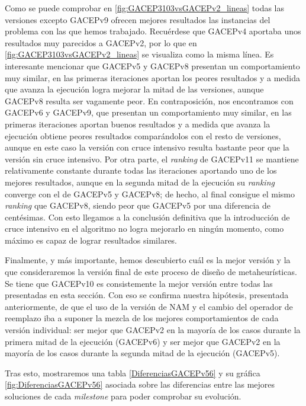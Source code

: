 Como se puede comprobar en \ref{fig:GACEP3103vsGACEPv2_lineas} todas las versiones excepto GACEPv9 ofrecen mejores resultados las instancias del problema con las que hemos trabajado. 
Recuérdese que GACEPv4 aportaba unos resultados muy parecidos a GACEPv2, por lo que en \ref{fig:GACEP3103vsGACEPv2_lineas} se visualiza como la misma línea. 
Es interesante mencionar que GACEPv5 y GACEPv8 presentan un comportamiento muy similar, en las primeras iteraciones aportan los peores resultados y a medida que avanza la ejecución logra mejorar la mitad de las versiones, aunque GACEPv8 resulta ser vagamente peor. 
En contraposición, nos encontramos con GACEPv6 y GACEPv9, que presentan un comportamiento muy similar, en las primeras iteraciones aportan buenos resultados y a medida que avanza la ejecución obtiene peores resultados comparándolos con el resto de versiones, aunque en este caso la versión con cruce intensivo resulta bastante peor que la versión sin cruce intensivo. 
Por otra parte, el \textit{ranking} de GACEPv11 se mantiene relativamente constante durante todas las iteraciones aportando uno de los mejores resultados, aunque en la segunda mitad de la ejecución su \textit{ranking} converge con el de GACEPv5 y GACEPv8; de hecho, al final consigue el mismo \textit{ranking} que GACEPv8, siendo peor que GACEPv5 por una diferencia de centésimas. 
Con esto llegamos a la conclusión definitiva que la introducción de cruce intensivo en el algoritmo no logra mejorarlo en ningún momento, como máximo es capaz de lograr resultados similares. 

Finalmente, y más importante, hemos descubierto cuál es la mejor versión y la que consideraremos la versión final de este proceso de diseño de metaheurísticas. 
Se tiene que GACEPv10 es consistemente la mejor versión entre todas las presentadas en esta sección. 
Con eso se confirma nuestra hipótesis, presentada anteriormente, de que el uso de la versión de NAM y el cambio del operador de reemplazo iba a suponer la mezcla de los mejores comportamientos de cada versión individual: ser mejor que GACEPv2 en la mayoría de los casos durante la primera mitad de la ejecución (GACEPv6) y ser mejor que GACEPv2 en la mayoría de los casos durante la segunda mitad de la ejecución (GACEPv5).

Tras esto, mostraremos una tabla \ref{DiferenciasGACEPv56} y su gráfica \ref{fig:DiferenciasGACEPv56} asociada sobre las diferencias entre las mejores soluciones de cada \textit{milestone} para poder comprobar su evolución. 

